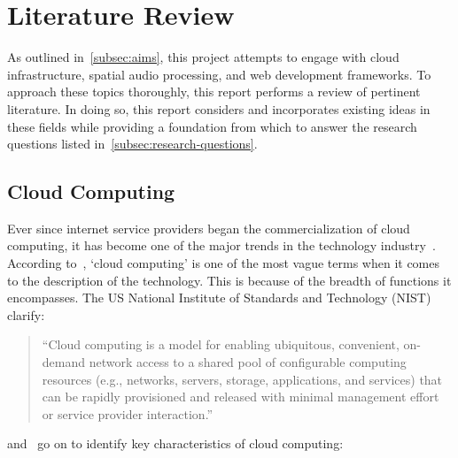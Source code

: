 
\thispagestyle{plain}
\newpage
\section{Literature Review}\label{sec:literature-review}

\normalsize

As outlined in~\ref{subsec:aims}, this project attempts to engage with cloud infrastructure, spatial audio processing, and web development frameworks.
To approach these topics thoroughly, this report performs a review of pertinent literature.
In doing so, this report considers and incorporates existing ideas in these fields while providing a foundation from which to answer the research questions listed in~\ref{subsec:research-questions}.

\subsection{Cloud Computing}\label{subsec:cloud-computing}

Ever since internet service providers began the commercialization of cloud computing,
it has become one of the major trends in the technology industry~\citep{cc_overview}.
According to~\citet{cc_overview}, `cloud computing' is one of the most vague terms when it comes to the description of the technology.
This is because of the breadth of functions it encompasses.
The US National Institute of Standards and Technology (NIST) clarify:

\begin{quotation}
    ``Cloud computing is a model for enabling ubiquitous, convenient, on-demand network access to a shared pool of configurable computing resources (e.g., networks, servers, storage, applications, and services) that can be rapidly provisioned and released with minimal management effort or service provider interaction.''~\citep{mell2011nist}
\end{quotation}\citet{mell2011nist} and~\citet{marinescu-cloud} go on to identify key characteristics of cloud computing:

